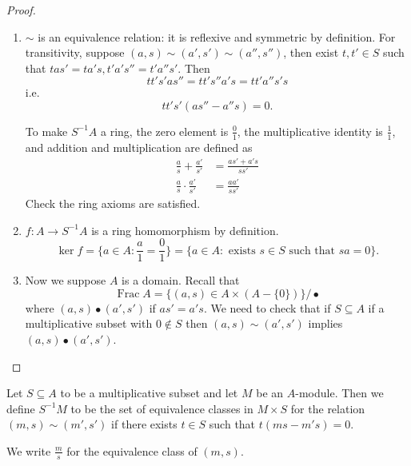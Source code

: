 \documentclass[a4paper]{article}
\DeclareMathOperator{\Frac}{Frac}
\begin{document}
\begin{proof}\leavevmode
  \begin{enumerate}
  \item \(\sim\) is an equivalence relation: it is reflexive and symmetric by definition. For transitivity, suppose \((a, s) \sim (a', s') \sim (a'', s'')\), then exist \(t, t' \in S\) such that \(tas' = ta's, t'a's'' = t'a''s'\). Then
    \[
      tt's'as'' = tt's''a's = tt'a''s's
    \]
    i.e.
    \[
      tt's'(as'' - a''s) = 0.
    \]

    To make \(S^{-1}A\) a ring, the zero element is \(\frac{0}{1}\), the multiplicative identity is \(\frac{1}{1}\), and addition and multiplication are defined as
    \begin{align*}
      \frac{a}{s} + \frac{a'}{s'} &= \frac{as' + a's}{ss'} \\
      \frac{a}{s} \cdot \frac{a'}{s'} &= \frac{aa'}{ss'}
    \end{align*}
    Check the ring axioms are satisfied.
  \item \(f: A \to S^{-1}A\) is a ring homomorphism by definition.
    \[
      \ker f = \{a \in A: \frac{a}{1} = \frac{0}{1}\} = \{a \in A: \text{ exists } s \in S \text{ such that } sa = 0\}.
    \]
  \item Now we suppose \(A\) is a domain. Recall that
    \[
      \Frac A = \{(a, s) \in A \times (A - \{0\})\} / \bullet
    \]
    where \((a, s) \bullet (a', s')\) if \(as' = a's\). We need to check that if \(S \subseteq A\) if a multiplicative subset with \(0 \notin S\) then \((a, s) \sim (a', s')\) implies \((a, s) \bullet (a', s')\).
  \end{enumerate}
\end{proof}

\begin{definition}
  Let \(S \subseteq A\) to be a multiplicative subset and let \(M\) be an \(A\)-module. Then we define \(S^{-1}M\) to be the set of equivalence classes in \(M \times S\) for the relation \((m, s) \sim (m', s')\) if there exists \(t \in S\) such that \(t(ms - m's) = 0\).

  We write \(\frac{m}{s}\) for the equivalence class of \((m, s)\).
\end{definition}
\end{document}

